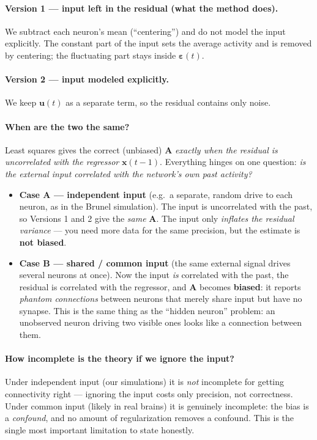 \documentclass[11pt,a4paper]{article}
\newcommand{\xx}{\mathbf{x}}
\newcommand{\uu}{\mathbf{u}}
\newcommand{\Amat}{\mathbf{A}}
\newcommand{\eps}{\boldsymbol{\varepsilon}}
\begin{document}
\paragraph{Version 1 --- input left in the residual (what the method does).}
We subtract each neuron's mean (``centering'') and do not model the input
explicitly. The constant part of the input sets the average activity and is
removed by centering; the fluctuating part stays inside $\eps(t)$.

\paragraph{Version 2 --- input modeled explicitly.}
We keep $\uu(t)$ as a separate term, so the residual contains only noise.

\paragraph{When are the two the same?}
Least squares gives the correct (unbiased) $\Amat$ \emph{exactly when the residual
is uncorrelated with the regressor} $\xx(t-1)$. Everything hinges on one
question: \emph{is the external input correlated with the network's own past
activity?}
\begin{itemize}
\item \textbf{Case A --- independent input} (e.g.\ a separate, random drive to
each neuron, as in the Brunel simulation). The input is uncorrelated with the
past, so Versions 1 and 2 give the \emph{same} $\Amat$. The input only
\emph{inflates the residual variance} --- you need more data for the same
precision, but the estimate is \textbf{not biased}.
\item \textbf{Case B --- shared / common input} (the same external signal drives
several neurons at once). Now the input \emph{is} correlated with the past, the
residual is correlated with the regressor, and $\Amat$ becomes \textbf{biased}: it
reports \emph{phantom connections} between neurons that merely share input but
have no synapse. This is the same thing as the ``hidden neuron'' problem: an
unobserved neuron driving two visible ones looks like a connection between them.
\end{itemize}

\paragraph{How incomplete is the theory if we ignore the input?}
Under independent input (our simulations) it is \emph{not} incomplete for getting
connectivity right --- ignoring the input costs only precision, not correctness.
Under common input (likely in real brains) it is genuinely incomplete: the bias
is a \emph{confound}, and no amount of regularization removes a confound. This is
the single most important limitation to state honestly.
\end{document}
